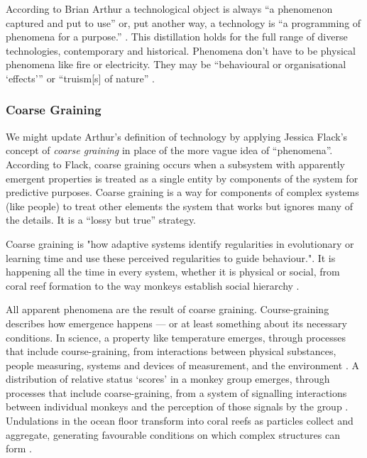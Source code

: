 \documentclass[letterpaper]{article}
\begin{document}
    According to Brian Arthur a technological object is always “a phenomenon captured and put to use” \citep[p.53]{theNatureOfTechnology2009} or, put another way, a technology is “a programming of phenomena for a purpose.” \citep[p.53]{theNatureOfTechnology2009}. This distillation holds for the full range of diverse technologies, contemporary and historical. Phenomena don't have to be physical phenomena like fire or electricity. They may be “behavioural or organisational ‘effects’” \citep[p.55]{theNatureOfTechnology2009} or “truism[s] of nature” \citep[p.45]{theNatureOfTechnology2009}.

    \subsubsection{Coarse Graining}
    
    We might update Arthur's definition of technology by applying Jessica Flack's concept of \emph{coarse graining} in place of the more vague idea of “phenomena”. According to Flack, coarse graining occurs when a subsystem with apparently emergent properties is treated as a single entity by components of the system for predictive purposes. Coarse graining is a way for components of complex systems (like people) to treat other elements the system that works but ignores many of the details. It is a “lossy but true” \citep[p.4]{FlackCrsGrnng2017} strategy.
    
    Coarse graining is "how adaptive systems identify regularities in evolutionary or learning time and use these perceived regularities to guide behaviour."\citep[p.2]{FlackCrsGrnngAsDwnwrdCstn2021}. It is happening all the time in every system, whether it is physical or social, from coral reef formation \citep[p.61]{FlackEtAlTmsclsSymmtryUncrtnty2013} to the way monkeys establish social hierarchy \citep{FlackCntxtMdltsSgnlMnng2007}.

    All apparent phenomena are the result of coarse graining. Course-graining describes how emergence happens — or at least something about its necessary conditions. In science, a property like temperature emerges, through processes that include course-graining, from interactions between physical substances, people measuring, systems and devices of measurement, and the environment \citep[p.4]{FlackCrsGrnng2017}. A distribution of relative status ‘scores’ in a monkey group emerges, through processes that include coarse-graining, from a system of signalling interactions between individual monkeys and the perception of those signals by the group \citep{FlackCntxtMdltsSgnlMnng2007}. Undulations in the ocean floor transform into coral reefs as particles collect and aggregate, generating favourable conditions on which complex structures can form \citep[p.61]{FlackEtAlTmsclsSymmtryUncrtnty2013}.
    
\end{document}
